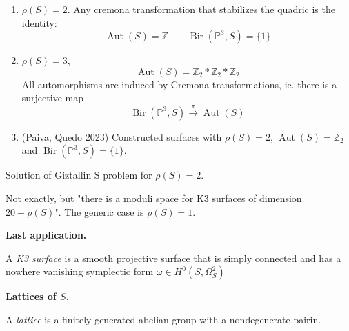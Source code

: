 \begin{example}[Oguiso, 2012]\leavevmode 
	\begin{enumerate}
		\item $\rho(S)=2$. Any cremona
		transformation that stabilizes the quadric
		is the identity:
			$$\operatorname{Aut}(S)=\mathbb{Z}\qquad
			\operatorname{Bir}(\mathbb{P}^3,S)=\{1\}$$
	
			
		\item $\rho(S)=3$,
			$$
			\operatorname{Aut}(S)=
			\mathbb{Z}_2*\mathbb{Z}_2*\mathbb{Z}_2
			$$
			All automorphisms are induced by Cremona
			transformations, ie. there is a surjective
			map
			$$
			\operatorname{Bir}(\mathbb{P}^3,S)
			\overset{\pi}{\longrightarrow}
			\operatorname{Aut}(S)
			$$

		\item (Paiva, Quedo 2023) Constructed
		surfaces with $\rho(S)=2$,
		$\operatorname{Aut}(S)=\mathbb{Z}_2$ and
		$\operatorname{Bir}(\mathbb{P}^3,S)=\{1\}$.
	\end{enumerate}
\end{example}

\begin{theorem}\leavevmode
	Solution of Giztallin S problem for
	$\rho(S)=2$.
\end{theorem}

\begin{remark}
	Not exactly, but "there is a moduli space
	for K3 surfaces of dimension $20-\rho(S)$".
	The generic case is $\rho(S)=1$.
\end{remark}

\medskip\noindent
\textbf{Last application.}

\begin{definition}
	A {\it K3 surface} is a smooth
	projective surface that is simply connected
	and has a nowhere vanishing symplectic form
	$\omega\in H^{0}(S,\Omega^2_S)$
\end{definition}

\medskip\noindent
\textbf{Lattices of $S$.}

A {\it lattice} is a
finitely-generated abelian group with a
nondegenerate pairin.

